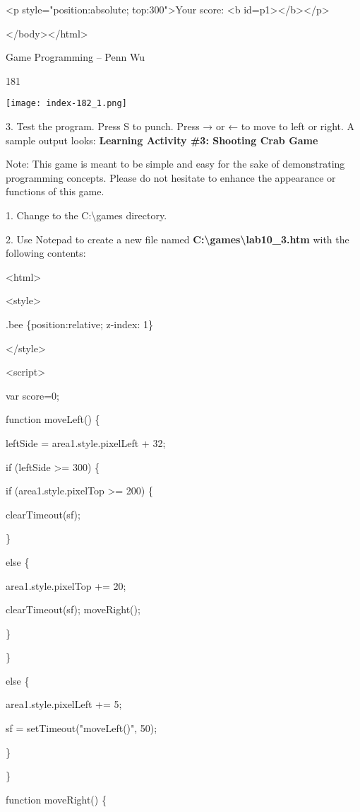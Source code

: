 \documentclass[
]{article}
\begin{document}
\textless p style="position:absolute; top:300"\textgreater Your score:
\textless b
id=p1\textgreater\textless/b\textgreater\textless/p\textgreater{}

\textless/body\textgreater\textless/html\textgreater{}

Game Programming -- Penn Wu

181

\protect\hypertarget{index_split_011.htmlux5cux23p182}{}{}\texttt{[image: index-182\_1.png]}

3. Test the program. Press S to punch. Press → or ← to move to left or
right. A sample output looks: \textbf{Learning Activity \#3: Shooting
Crab Game}

Note: This game is meant to be simple and easy for the sake of
demonstrating programming concepts. Please do not hesitate to enhance
the appearance or functions of this game.

1. Change to the C:\textbackslash games directory.

2. Use Notepad to create a new file named
\textbf{C:\textbackslash games\textbackslash lab10\_3.htm} with the
following contents:

\textless html\textgreater{}

\textless style\textgreater{}

.bee \{position:relative; z-index: 1\}

\textless/style\textgreater{}

\textless script\textgreater{}

var score=0;

function moveLeft() \{

leftSide = area1.style.pixelLeft + 32;

if (leftSide \textgreater= 300) \{

if (area1.style.pixelTop \textgreater= 200) \{

clearTimeout(sf);

\}

else \{

area1.style.pixelTop += 20;

clearTimeout(sf); moveRight();

\}

\}

else \{

area1.style.pixelLeft += 5;

sf = setTimeout("moveLeft()", 50);

\}

\}

function moveRight() \{
\end{document}
